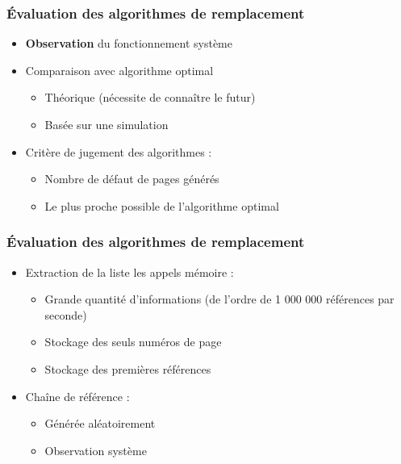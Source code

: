 \begin{frame}
\frametitle{Évaluation des algorithmes de remplacement}
\begin{itemize}
\item \textbf{Observation} du fonctionnement système
\item Comparaison avec algorithme optimal
\begin{itemize}
\item Théorique (nécessite de connaître le futur)
\item Basée sur une simulation
\end{itemize}
\item Critère de jugement des algorithmes :
\begin{itemize}
\item Nombre de défaut de pages générés
\item Le plus proche possible de l'algorithme optimal
\end{itemize}
\end{itemize}
\end{frame}


\begin{frame}
\frametitle{Évaluation des algorithmes de remplacement}
\begin{itemize}
\item Extraction de la liste les appels mémoire :
\begin{itemize}
\item Grande quantité d'informations (de l'ordre de 1 000 000 références par seconde)
\item Stockage des seuls numéros de page
\item Stockage des premières références
\end{itemize}
\item Chaîne de référence :
\begin{itemize}
\item Générée aléatoirement 
\item Observation système
\end{itemize}
\end{itemize}
\end{frame}


